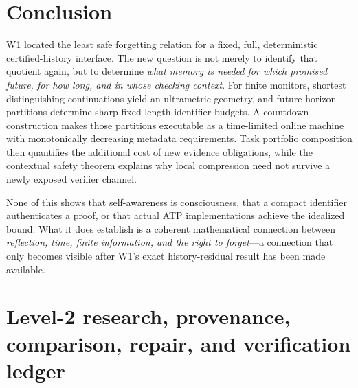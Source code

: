 \documentclass[11pt,letterpaper]{article}
\begin{document}
\section{Conclusion}
W1 located the least safe forgetting relation for a fixed, full, deterministic certified-history interface. The new question is not merely to identify that quotient again, but to determine \emph{what memory is needed for which promised future, for how long, and in whose checking context}. For finite monitors, shortest distinguishing continuations yield an ultrametric geometry, and future-horizon partitions determine sharp fixed-length identifier budgets. A countdown construction makes those partitions executable as a time-limited online machine with monotonically decreasing metadata requirements. Task portfolio composition then quantifies the additional cost of new evidence obligations, while the contextual safety theorem explains why local compression need not survive a newly exposed verifier channel.

None of this shows that self-awareness is consciousness, that a compact identifier authenticates a proof, or that actual ATP implementations achieve the idealized bound. What it does establish is a coherent mathematical connection between \emph{reflection, time, finite information, and the right to forget}---a connection that only becomes visible after W1's exact history-residual result has been made available.

\appendix
\section{Level-2 research, provenance, comparison, repair, and verification ledger}\label{app:ledger}
\end{document}
